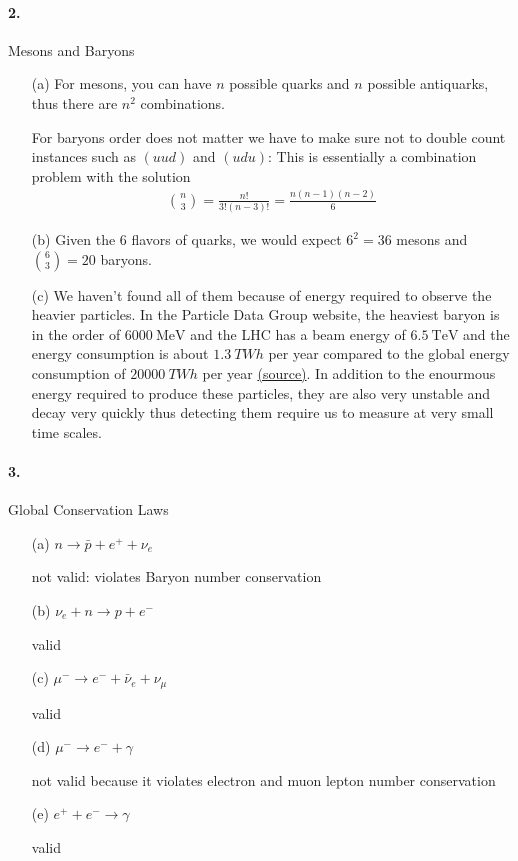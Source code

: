 \documentclass[../main.tex]{subfiles}
\begin{document}
\paragraph{2.} Mesons and Baryons
\begin{itemize}
\item [(a)] For mesons, you can have $n$ possible quarks and $n$ possible antiquarks, thus there are
$\boxed{n^2}$ combinations.

For baryons order does not matter we have to make sure not to double count instances such as $(uud)$
and $(udu)$: This is essentially a combination problem with the solution
\begin{align*}
    \binom{n}{3} = \frac{n!}{3!(n-3)!} = \boxed{\frac{n(n-1)(n-2)}{6}}
\end{align*}

\item[(b)] Given the 6 flavors of quarks, we would expect $6^2 = 36$ mesons and $\binom{6}{3} = 20$ baryons.

\item[(c)] We haven't found all of them because of energy required to observe the heavier particles. In
the Particle Data Group website, the heaviest baryon is in the order of $\qty{6000}{\MeV}$ and the 
LHC has a beam energy of $\qty{6.5}{\TeV}$ and the energy consumption is about $\qty{1.3}{TWh}$ per
year compared to the global energy consumption of $\qty{20000}{TWh}$ per year 
\href{https://home.cern/resources/faqs/facts-and-figures-about-lhc}{(source)}. In addition to the
enourmous energy required to produce these particles, they are also very unstable and decay very
quickly thus detecting them require us to measure at very small time scales.

\end{itemize}

\paragraph{3.} Global Conservation Laws

\begin{itemize}
    \item [(a)] $n \rightarrow \bar p + e^+ + \nu_e$ 
    
    not valid: violates Baryon number conservation
    \item [(b)] $\nu_e + n \rightarrow p + e^-$
    
    valid
    \item [(c)] $\mu^- \rightarrow e^- + \bar{\nu}_e + \nu_\mu$
    
    valid
    \item [(d)] $\mu^- \rightarrow e^- + \gamma$
    
    not valid because it violates electron and muon lepton number conservation
    \item [(e)] $e^+ + e^- \rightarrow \gamma$
    
    valid
\end{itemize}
\end{document}
